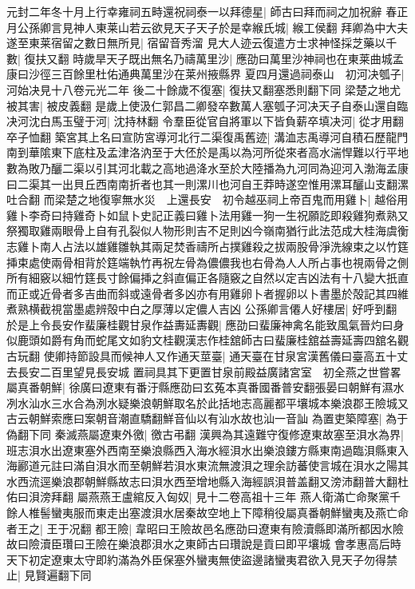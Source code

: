 元封二年冬十月上行幸雍祠五畤還祝祠泰一以拜德星|{
	師古曰拜而祠之加祝辭}
春正月公孫卿言見神人東莱山若云欲見天子天子於是幸緱氏城|{
	緱工侯翻}
拜卿為中大夫遂至東莱宿留之數日無所見|{
	宿留音秀溜}
見大人迹云復遣方士求神怪採芝藥以千數|{
	復扶又翻}
時歲旱天子既出無名乃禱萬里沙|{
	應劭曰萬里沙神祠也在東莱曲城孟康曰沙徑三百餘里杜佑通典萬里沙在莱州掖縣界}
夏四月還過祠泰山　初河决瓠子|{
	河始决見十八卷元光二年}
後二十餘歲不復塞|{
	復扶又翻塞悉則翻下同}
梁楚之地尤被其害|{
	被皮義翻}
是歲上使汲仁郭昌二卿發卒數萬人塞瓠子河决天子自泰山還自臨决河沈白馬玉璧于河|{
	沈持林翻}
令羣臣從官自將軍以下皆負薪卒填决河|{
	從才用翻卒子恤翻}
築宮其上名曰宣防宮導河北行二渠復禹舊迹|{
	溝洫志禹導河自積石歷龍門南到華隂東下底柱及孟津洛汭至于大伾於是禹以為河所從來者高水湍悍難以行平地數為敗乃釃二渠以引其河北載之高地過洚水至於大陸播為九河同為迎河入渤海孟康曰二渠其一出貝丘西南南折者也其一則漯川也河自王莽時遂空惟用漯耳釃山支翻漯吐合翻}
而梁楚之地復寧無水災　上還長安　初令越巫祠上帝百鬼而用雞卜|{
	越俗用雞卜李奇曰持雞奇卜如鼠卜史記正義曰雞卜法用雞一狗一生祝願訖即殺雞狗煮熟又祭獨取雞兩眼骨上自有孔裂似人物形則吉不足則凶今嶺南猶行此法范成大桂海虞衡志雞卜南人占法以雄雞雛執其兩足焚香禱所占撲雞殺之拔兩股骨淨洗線束之以竹筳挿束處使兩骨相背於筳端執竹再祝左骨為儂儂我也右骨為人人所占事也視兩骨之側所有細竅以細竹筳長寸餘偏挿之斜直偏正各隨竅之自然以定吉凶法有十八變大扺直而正或近骨者多吉曲而斜或遠骨者多凶亦有用雞卵卜者握卵以卜書墨於殻記其四維煮熟横截視當墨處辨殻中白之厚薄以定儂人吉凶}
公孫卿言僊人好樓居|{
	好呼到翻}
於是上令長安作蜚廉桂觀甘泉作益夀延夀觀|{
	應劭曰蜚廉神禽名能致風氣晉灼曰身似鹿頭如爵有角而蛇尾文如豹文桂觀漢志作桂舘師古曰蜚廉桂舘益壽延壽四舘名觀古玩翻}
使卿持節設具而候神人又作通天莖臺|{
	通天臺在甘泉宮漢舊儀曰臺高五十丈去長安二百里望見長安城}
置祠具其下更置甘泉前殿益廣諸宮室　初全燕之世嘗畧屬真番朝鮮|{
	徐廣曰遼東有番汙縣應劭曰玄菟本真番國番普安翻張晏曰朝鮮有濕水冽水汕水三水合為洌水疑樂浪朝鮮取名於此括地志高麗都平壤城本樂浪郡王險城又古云朝鮮索應曰案朝音潮直驕翻鮮音仙以有汕水故也汕一音訕}
為置吏築障塞|{
	為于偽翻下同}
秦滅燕屬遼東外徼|{
	徼古弔翻}
漢興為其遠難守復修遼東故塞至浿水為界|{
	班志浿水出遼東塞外西南至樂浪縣西入海水經浿水出樂浪鏤方縣東南過臨浿縣東入海酈道元註曰滿自浿水而至朝鮮若浿水東流無渡浿之理余訪蕃使言城在浿水之陽其水西流逕樂浪郡朝鮮縣故志曰浿水西至增地縣入海經誤浿普盖翻又滂沛翻普大翻杜佑曰浿滂拜翻}
屬燕燕王盧綰反入匈奴|{
	見十二卷高祖十三年}
燕人衛滿亡命聚黨千餘人椎髻蠻夷服而東走出塞渡浿水居秦故空地上下障稍役屬真番朝鮮蠻夷及燕亡命者王之|{
	王于况翻}
都王險|{
	韋昭曰王險故邑名應劭曰遼東有險瀆縣即滿所都因水險故曰險瀆臣瓚曰王險在樂浪郡浿水之東師古曰瓚說是貢曰即平壤城}
會孝惠高后時天下初定遼東太守即約滿為外臣保塞外蠻夷無使盜邊諸蠻夷君欲入見天子勿得禁止|{
	見賢遍翻下同}
